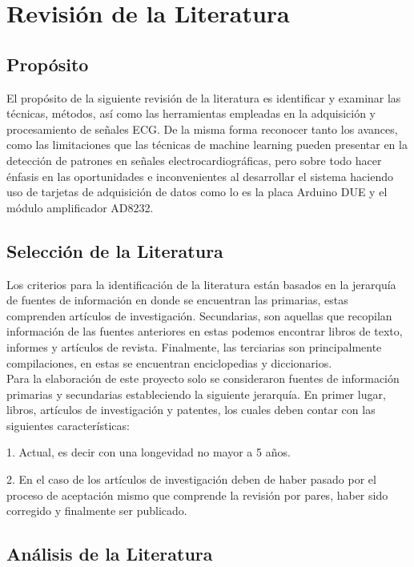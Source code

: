 \chapter{Revisión de la Literatura}
\label{chap:Rev_Lit}

\section{Propósito}
El propósito de la siguiente revisión de la literatura es identificar y examinar las técnicas, métodos, así como las herramientas empleadas en la adquisición y procesamiento de señales ECG. De la misma forma reconocer tanto los avances, como las limitaciones que las técnicas de machine learning pueden presentar en la detección de patrones en señales electrocardiográficas, pero sobre todo hacer énfasis en las oportunidades e inconvenientes al desarrollar el sistema haciendo uso de tarjetas de adquisición de datos como lo es la placa Arduino DUE y el módulo amplificador AD8232.\\

\section{Selección de la Literatura}
Los criterios para la identificación de la literatura están basados en la jerarquía de fuentes de información en donde se encuentran las primarias, estas comprenden artículos de investigación. Secundarias, son aquellas que recopilan información de las fuentes anteriores en estas podemos encontrar libros de texto, informes y artículos de revista. Finalmente, las terciarias son principalmente compilaciones, en estas se encuentran enciclopedias y diccionarios. \\

Para la elaboración de este proyecto solo se consideraron fuentes de información primarias y secundarias estableciendo la siguiente jerarquía. En primer lugar, libros, artículos de investigación y patentes, los cuales deben contar con las siguientes características:

1. Actual, es decir con una longevidad no mayor a 5 años.

2. En el caso de los artículos de investigación deben de haber pasado por el proceso de aceptación mismo que comprende la revisión por pares, haber sido corregido y finalmente ser publicado.

\section{Análisis de la Literatura}

